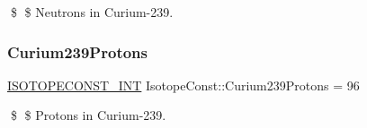 \$ \$ Neutrons in Curium-\/239. \mbox{\label{group___isotope_const-_curium-_cm239_gae6e16ea3bcd3d07f73e7ccc0e0e9c6c1}} 
\subsubsection{\texorpdfstring{Curium239\+Protons}{Curium239Protons}}
{\footnotesize\ttfamily \mbox{\hyperlink{group___isotope_const-_macros_ga5f18360b3e99483a35c32d789e62621c}{I\+S\+O\+T\+O\+P\+E\+C\+O\+N\+S\+T\+\_\+\+I\+NT}} Isotope\+Const\+::\+Curium239\+Protons = 96}

\$ \$ Protons in Curium-\/239. 